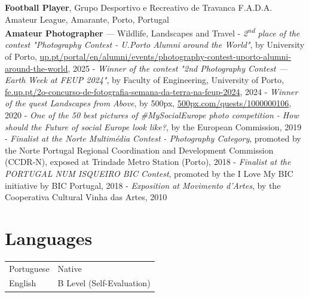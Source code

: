 \documentclass[10pt, a4paper]{article}
\newcommand{\FEUP}{Faculty of Engineering, University of Porto}
\newcommand{\Address}{Porto, Portugal}
\newcommand{\years}[1]{\marginnote{\raggedleft\footnotesize #1}}
\newcommand{\TablePad}{\vspace{-0.4cm}}
\let\oldhref\href
\renewcommand{\href}[2]{\oldhref{#1}{{\small #2}}}
\begin{document}
\years{2016--2017} 
\textbf{Football Player}, Grupo Desportivo e Recreativo de Travanca 
\newline
F.A.D.A. Amateur League, Amarante, \Address{}
\\[0.42em]
\years{2008---} 
\textbf{Amateur Photographer} --- Wildlife, Landscapes and Travel
\newline
- \textit{2\textsuperscript{nd} place of the contest "Photography Contest - U.Porto Alumni around the World"}, by University of Porto, \href{https://www.up.pt/portal/en/alumni/events/photography-contest-uporto-alumni-around-the-world/}{up.pt/portal/en/alumni/events/photography-contest-uporto-alumni-around-the-world}, 2025
\newline
- \textit{Winner of the contest "2nd Photography Contest --- Earth Week at FEUP 2024"}, by \FEUP, \href{https://fe.up.pt/sustent/projetos-e-iniciativas/2o-concurso-de-fotografia-semana-da-terra-na-feup-2024/}{fe.up.pt/2o-concurso-de-fotografia-semana-da-terra-na-feup-2024}, 2024
\newline
- \textit{Winner of the quest \textit{Landscapes from Above}}, by 500px, \href{https://web.500px.com/quests/1000000106/landscapes-from-above}{500px.com/quests/1000000106}, 2020
\newline
- \textit{One of the 50 best pictures of \#MySocialEurope photo competition - How should the Future of social Europe look like?}, by the European Commission, 2019
\newline
- \textit{Finalist at the Norte Multimédia Contest - Photography Category}, promoted by the Norte Portugal Regional Coordination and Development Commission (CCDR-N), exposed at Trindade Metro Station (Porto), 2018
\newline
- \textit{Finalist at the PORTUGAL NUM ISQUEIRO BIC Contest}, promoted by the I Love My BIC initiative by BIC Portugal, 2018
\newline
- \textit{Exposition at Movimento d'Artes}, by the Cooperativa Cultural Vinha das Artes, 2010


\section*{Languages}

\TablePad
\begin{tabularx}{\textwidth}{@{}p{} p{}@{}}
	Portuguese & Native                    
	\\
	English    & B Level (Self-Evaluation) 
\end{tabularx}

\end{document}
